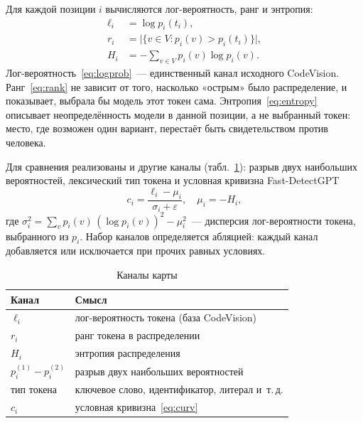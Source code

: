 \documentclass{misisarticle}
\begin{document}
Для каждой позиции $i$ вычисляются лог-вероятность, ранг и энтропия:
\begin{align}
  \ell_i &= \log p_i(t_i), \label{eq:logprob}\\
  r_i &= \bigl|\{v \in V : p_i(v) > p_i(t_i)\}\bigr|, \label{eq:rank}\\
  H_i &= -\sum_{v \in V} p_i(v) \log p_i(v). \label{eq:entropy}
\end{align}
Лог-вероятность~\eqref{eq:logprob}~--- единственный канал исходного CodeVision. Ранг~\eqref{eq:rank} не зависит от того, насколько «острым» было распределение, и показывает, выбрала бы модель этот токен сама. Энтропия~\eqref{eq:entropy} описывает неопределённость модели в данной позиции, а не выбранный токен: место, где возможен один вариант, перестаёт быть свидетельством против человека.

Для сравнения реализованы и другие каналы (табл.~\ref{tab:channels}): разрыв двух наибольших вероятностей, лексический тип токена и условная кривизна Fast-DetectGPT~\cite{fastdetectgpt}
\begin{equation}
  c_i = \frac{\ell_i - \mu_i}{\sigma_i + \varepsilon}, \quad \mu_i = -H_i,
  \label{eq:curv}
\end{equation}
где $\sigma_i^2 = \sum_{v} p_i(v)\,(\log p_i(v))^2 - \mu_i^2$~--- дисперсия лог-вероятности токена, выбранного из $p_i$. Набор каналов определяется абляцией: каждый канал добавляется или исключается при прочих равных условиях.

\begin{table}[htbp]
  \caption{Каналы карты}
  \label{tab:channels}
  \centering
  \begin{tabular}{>{\raggedright\arraybackslash}p{}>{\raggedright\arraybackslash}p{}}
    \toprule
    \textbf{Канал} & \textbf{Смысл} \\
    \midrule
    $\ell_i$ & лог-вероятность токена (база CodeVision) \\
    $r_i$ & ранг токена в распределении \\
    $H_i$ & энтропия распределения \\
    $p_i^{(1)} - p_i^{(2)}$ & разрыв двух наибольших вероятностей \\
    тип токена & ключевое слово, идентификатор, литерал и~т.\,д. \\
    $c_i$ & условная кривизна~\eqref{eq:curv} \\
    \bottomrule
  \end{tabular}
\end{table}
\end{document}
